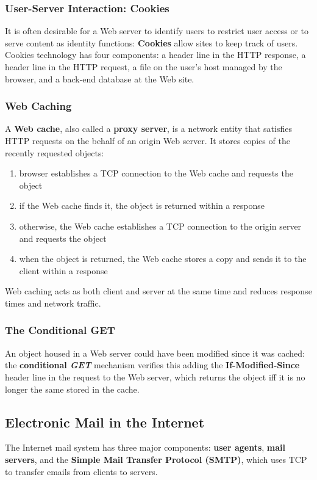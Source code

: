 \documentclass{article}
\begin{document}
\subsubsection{User-Server Interaction: Cookies}
It is often desirable for a Web server to identify users to restrict user access or to serve content as identity functions: \textbf{Cookies} allow sites to keep track of users.
Cookies technology has four components: a header line in the HTTP response, a header line in the HTTP request, a file on the user's host managed by the browser, and a back-end database at the Web site.
\subsubsection{Web Caching}
A \textbf{Web cache}, also called a \textbf{proxy server}, is a network entity that satisfies HTTP requests on the behalf of an origin Web server. It stores copies of the recently requested objects:
\begin{enumerate}
    \item browser establishes a TCP connection to the Web cache and requests the object
    \item if the Web cache finds it, the object is returned within a response
    \item otherwise, the Web cache establishes a TCP connection to the origin server and requests the object
    \item when the object is returned, the Web cache stores a copy and sends it to the client within a response
\end{enumerate}
Web caching acts as both client and server at the same time and reduces response times and network traffic. \\
\subsubsection*{The Conditional GET}
An object housed in a Web server could have been modified since it was cached: the \textbf{conditional \textit{GET}} mechanism verifies this adding the \textbf{If-Modified-Since} header line in the request to the Web server, which returns the object iff it is no longer the same stored in the cache.

\subsection{Electronic Mail in the Internet}
The Internet mail system has three major components: \textbf{user agents}, \textbf{mail servers}, and the \textbf{Simple Mail Transfer Protocol (SMTP)}, which uses TCP to transfer emails from clients to servers.
\end{document}
